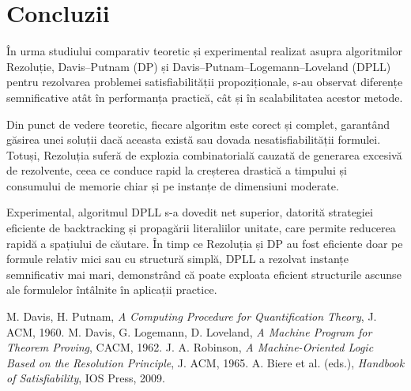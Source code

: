 \documentclass[12pt]{article}
\begin{document}
\section{Concluzii}
În urma studiului comparativ teoretic și experimental realizat asupra algoritmilor Rezoluție, Davis–Putnam (DP) și Davis–Putnam–Logemann–Loveland (DPLL) pentru rezolvarea problemei satisfiabilității propoziționale, s-au observat diferențe semnificative atât în performanța practică, cât și în scalabilitatea acestor metode.

Din punct de vedere teoretic, fiecare algoritm este corect și complet, garantând găsirea unei soluții dacă aceasta există sau dovada nesatisfiabilității formulei. Totuși, Rezoluția suferă de explozia combinatorială cauzată de generarea excesivă de rezolvente, ceea ce conduce rapid la creșterea drastică a timpului și consumului de memorie chiar și pe instanțe de dimensiuni moderate.

Experimental, algoritmul DPLL s-a dovedit net superior, datorită strategiei eficiente de backtracking și propagării literaliilor unitate, care permite reducerea rapidă a spațiului de căutare. În timp ce Rezoluția și DP au fost eficiente doar pe formule relativ mici sau cu structură simplă, DPLL a rezolvat instanțe semnificativ mai mari, demonstrând că poate exploata eficient structurile ascunse ale formulelor întâlnite în aplicații practice.
\newpage
\begin{thebibliography}{99}
   M. Davis, H. Putnam, \textit{A Computing Procedure for Quantification Theory}, J. ACM, 1960.
   M. Davis, G. Logemann, D. Loveland, \textit{A Machine Program for Theorem Proving}, CACM, 1962.
   J. A. Robinson, \textit{A Machine-Oriented Logic Based on the Resolution Principle}, J. ACM, 1965.
   A. Biere et al. (eds.), \textit{Handbook of Satisfiability}, IOS Press, 2009.
\end{thebibliography}
\end{document}
